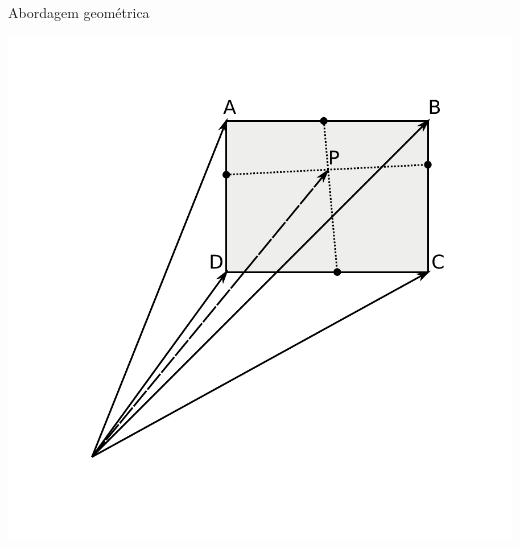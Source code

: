 \documentclass{beamer}
\begin{document}
\begin{frame}{Abordagem geométrica}
	\begin{center}
	\includegraphics[keepaspectratio, width=1.0\textwidth, height=0.8\textheight, clip, trim=0.75in 0.75in 0.70in 0.50in]{../monografia/img/geometria_ABCD2.pdf}
	\end{center}
\end{frame}
\end{document}
